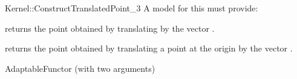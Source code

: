 \begin{ccRefFunctionObjectConcept}{Kernel::ConstructTranslatedPoint_3}
A model for this must provide:


       {returns the point obtained by translating  by the vector 
        .}

       {returns the point obtained by translating a point at the origin by the vector 
        .}

\ccRefines
AdaptableFunctor (with two arguments)

\ccSeeAlso
{} \\

\end{ccRefFunctionObjectConcept}
